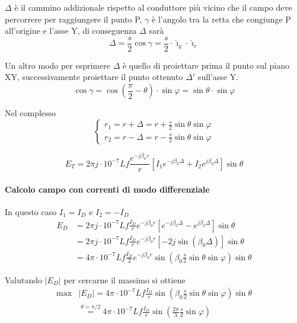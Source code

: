 
$\Delta$ è il cammino addizionale rispetto al conduttore più vicino
che il campo deve percorrere per raggiungere il punto P,
$\gamma$ è l'angolo tra la retta che congiunge P all'origine e l'asse Y, di conseguenza
$\Delta$ sarà 
$$
\Delta = \frac{s}{2}\cos\gamma = \frac{s}{2}\cdot \hat{\imath}_y\cdot \hat{\imath}_r
$$

Un altro modo per esprimere $\Delta$ è quello di proiettare prima il punto sul piano XY, successivamente
proiettare il punto ottenuto $\Delta'$ sull'asse Y.
$$
\cos\gamma = \cos\left(\frac{\pi}{2} - \theta\right) \cdot \sin\varphi = \sin\theta \cdot \sin\varphi
$$

Nel complesso
$$
\begin{cases}
r_1 = r + \Delta = r + \frac{s}{2} \sin\theta \sin\varphi \\
r_2 = r - \Delta = r - \frac{s}{2} \sin\theta \sin\varphi
\end{cases}
$$

$$
E_T = 2 \pi j \cdot 10^{-7} L f \frac{e^{-j \beta_0 r}}{r} \left[I_1 e^{-j \beta_0 \Delta} + I_2 e^{j \beta_0 \Delta} \right]\sin\theta
$$

\paragraph{Calcolo campo con correnti di modo differenziale}
In questo caso $I_1 = I_D$ e $I_2 = -I_D$
\begin{equation*}
 \begin{split}
E_D & = 2 \pi j \cdot 10^{-7} L f \frac{I_D}{r}e^{-j \beta_0 r} \left[e^{-j \beta_0 \Delta} - e^{j \beta_0 \Delta} \right]\sin\theta \\
 & = 2 \pi j \cdot 10^{-7} L f \frac{I_D}{r}e^{-j \beta_0 r} \left[-2j\sin(\beta_0\Delta)\right]\sin\theta \\ %
 & = 4\pi\cdot10^{-7}Lf\frac{I_D}{2}e^{-j\beta_0 r} \sin\left(\beta_0 \frac{s}{2} \sin\theta \sin\varphi \right)\sin\theta
  \end{split}
\end{equation*}

Valutando $\left|E_D\right|$ per cercarne il massimo si ottiene
\begin{equation*}
 \begin{split}
\text{max}&\left|E_D\right| = 4\pi\cdot10^{-7}Lf\frac{I_D}{r}\sin\left(\beta_0 \frac{s}{2} \sin\theta \sin\varphi \right)\sin\theta \\
& \stackrel{\theta = \pi/2}{=} 4\pi\cdot10^{-7}Lf\frac{I_D}{r}\sin\left(\frac{2\pi}{\lambda} \frac{s}{2} \sin\varphi \right) 
  \end{split}
\end{equation*}

